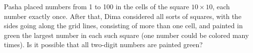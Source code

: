 Pasha placed numbers from 1 to 100 in the cells of the square $10\times 10$, each number exactly once. After that, Dima considered all sorts of squares, with the sides going along the grid lines, consisting of more than one cell, and painted in green the largest number in each such square (one number could be colored many times). Is it possible that all two-digit numbers are painted green?